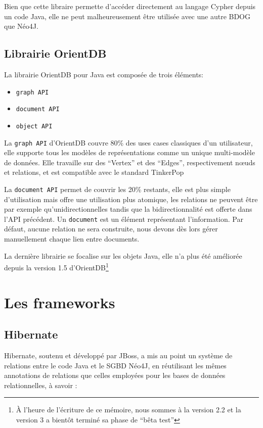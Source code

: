 \documentclass[a4paper,fleqn,12pt,oneside]{report}
\begin{document}
Bien que cette libraire permette d'accéder directement au langage Cypher depuis un code Java, elle ne peut malheureusement être utilisée avec une autre BDOG que Néo4J. 
\newpage
\subsection{Librairie OrientDB}

La librairie OrientDB pour Java est composée de trois éléments:

\begin{itemize}
\item \texttt{graph API}
\item \texttt{document API}
\item \texttt{object API}
\end{itemize}

La \texttt{graph API} d’OrientDB couvre 80\% des uses cases classiques d’un utilisateur, elle supporte tous les modèles de représentations comme un unique multi-modèle de données. Elle travaille sur des \enquote{Vertex} et des \enquote{Edges}, respectivement nœuds et relations, et est compatible avec le standard TinkerPop

La \texttt{document API} permet de couvrir les 20\% restants, elle est plus simple d’utilisation mais offre une utilisation plus atomique, les relations ne peuvent être par exemple qu’unidirectionnelles tandis que la bidirectionnalité est offerte dans l’API précédent. Un \texttt{document} est un élément représentant l'information. Par défaut, aucune relation ne sera construite, nous devons dès lors gérer manuellement chaque lien entre documents.

La dernière librairie se focalise sur les objets Java, elle n'a plus été améliorée depuis la version 1.5 d'OrientDB\footnote{À l'heure de l'écriture de ce mémoire, nous sommes à la version 2.2 et la version 3 a bientôt terminé sa phase de \enquote{bêta test}}

\section{Les frameworks}

\subsection{Hibernate}

Hibernate, soutenu et développé par JBoss, a mis au point un système de relations entre le code Java et le SGBD Néo4J, en réutilisant les mêmes annotations de relations que celles employées pour les bases de données relationnelles, à savoir :
\end{document}
